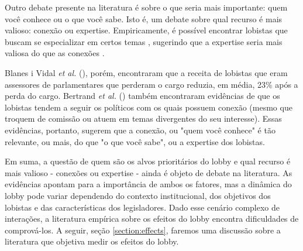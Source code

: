 Outro debate presente na literatura é sobre o que seria mais importante: quem você conhece ou o que você sabe. Isto é, um debate sobre qual recurso é mais valioso: conexão ou expertise. Empiricamente, é possível encontrar lobistas que buscam se especializar em certos temas \cite{de_figueiredo_advancing_2014}, sugerindo que a expertise seria mais valiosa do que as conexões \cite{bertrand2014whom}.

Blanes i Vidal \textit{et al.} (\citeyear{blanes2012}), porém, encontraram que a receita de lobistas que eram assessores de parlamentares que perderam o cargo reduzia, em média, 23\% após a perda do cargo. Bertrand \textit{et al.} (\citeyear{bertrand2014whom}) também encontraram evidências de que os lobistas tendem a seguir os políticos com os quais possuem conexão (mesmo que troquem de comissão ou atuem em temas divergentes do seu interesse). Essas evidências, portanto, sugerem que a conexão, ou "quem você conhece" é tão relevante, ou mais, do que "o que você sabe", ou a expertise dos lobistas.

Em suma, a questão de quem são os alvos prioritários do lobby e qual recurso é mais valioso - conexões ou expertise - ainda é objeto de debate na literatura. As evidências apontam para a importância de ambos os fatores, mas a dinâmica do lobby pode variar dependendo do contexto institucional, dos objetivos dos lobistas e das características dos legisladores. Dado esse cenário complexo de interações, a literatura empírica sobre os efeitos do lobby encontra dificuldades de comprová-los. A seguir, seção \ref{section:effects}, faremos uma discussão sobre a literatura que objetiva medir os efeitos do lobby.



